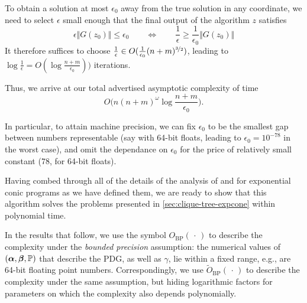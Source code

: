\begin{subappendices}
\begin{lproof}
    To obtain a solution at most $\epsilon_0$ away from the true
    solution in any coordinate, we need to select $\epsilon$ small enough
    that the final output of the algorithm $z$ satisfies
    \[
        \epsilon \Vert G(z_0) \Vert  \le \epsilon_0
        \qquad\iff\qquad
        \frac1\epsilon \ge \frac1{\epsilon_0} \Vert G(z_0) \Vert
    \]
    It therefore suffices to choose
    $\frac{1}{\epsilon} \in O(\frac1{\epsilon_0} (n+m)^{\nicefrac32})$,
    leading to $\log \frac{1}{\epsilon} = O( \log \frac{n+m}{\epsilon_0} ) )$
    iterations.

    Thus, we arrive at our total advertised asymptotic complexity of time
    \[
        O \Big( n (n+m)^\omega \log \frac{n+m}{\epsilon_0} \Big).
    \]

    In particular, to attain machine precision, we can fix
    $\epsilon_0$ to be the smallest gap between numbers representable
    (say with 64-bit floats, leading to $\epsilon_0 = 10^{-78}$ in the worst case), and omit the dependance on $\epsilon_0$ for the price of relatively
    small constant (78, for 64-bit floats).
\end{lproof}


Having combed through all of the details of the analysis of  \textcite{badenbroek2021algorithm} and \textcite{nesterov1996infeasible} for exponential
conic programs as we have defined them, we are ready to show that this algorithm solves the problems presented in \cref{sec:clique-tree-expcone} within polynomial time.

In the results that follow, we use the symbol $O_{\text{BP}}( \, \cdot \,)$ to describe the complexity under the \emph{bounded precision} assumption:  the numerical values of $(\boldsymbol\alpha,\boldsymbol\beta, \mathbb P)$ that describe the PDG, as well as $\gamma$, lie within a fixed range, e.g., are 64-bit floating point numbers.
Correspondingly, we use $\tilde O_{\text{BP}}(\,\cdot\,)$ to describe the complexity
under the same assumption, but hiding logarithmic factors for parameters on which the complexity also depends polynomially.


\end{subappendices}

